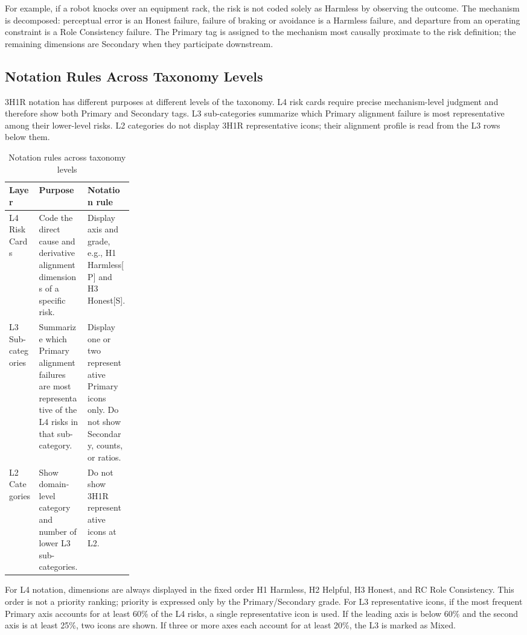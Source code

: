\documentclass[11pt]{article}
\begin{document}
For example, if a robot knocks over an equipment rack, the risk is not coded solely as Harmless by observing the outcome. The mechanism is decomposed: perceptual error is an Honest failure, failure of braking or avoidance is a Harmless failure, and departure from an operating constraint is a Role Consistency failure. The Primary tag is assigned to the mechanism most causally proximate to the risk definition; the remaining dimensions are Secondary when they participate downstream.

\subsection{Notation Rules Across Taxonomy Levels}

3H1R notation has different purposes at different levels of the taxonomy. L4 risk cards require precise mechanism-level judgment and therefore show both Primary and Secondary tags. L3 sub-categories summarize which Primary alignment failure is most representative among their lower-level risks. L2 categories do not display 3H1R representative icons; their alignment profile is read from the L3 rows below them.

\begin{table}[htbp]
\centering
\footnotesize
\caption{Notation rules across taxonomy levels}
\label{tab:notation-rules}
\begin{tabularx}{\linewidth}{p{0.24\linewidth}X X}
\toprule
Layer & Purpose & Notation rule \\
\midrule
L4 Risk Cards & Code the direct cause and derivative alignment dimensions of a specific risk. & Display axis and grade, e.g., H1 Harmless[P] and H3 Honest[S]. \\
L3 Sub-categories & Summarize which Primary alignment failures are most representative of the L4 risks in that sub-category. & Display one or two representative Primary icons only. Do not show Secondary, counts, or ratios. \\
L2 Categories & Show domain-level category and number of lower L3 sub-categories. & Do not show 3H1R representative icons at L2. \\
\bottomrule
\end{tabularx}
\end{table}

For L4 notation, dimensions are always displayed in the fixed order H1 Harmless, H2 Helpful, H3 Honest, and RC Role Consistency. This order is not a priority ranking; priority is expressed only by the Primary/Secondary grade. For L3 representative icons, if the most frequent Primary axis accounts for at least 60\% of the L4 risks, a single representative icon is used. If the leading axis is below 60\% and the second axis is at least 25\%, two icons are shown. If three or more axes each account for at least 20\%, the L3 is marked as Mixed.
\end{document}

